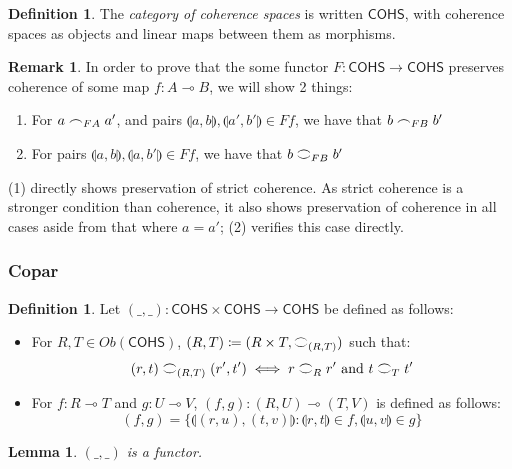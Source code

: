 \documentclass[11pt, oneside]{article}
\theoremstyle{plain}
\newtheorem{lemma}[theorem]{Lemma}
\theoremstyle{definition}
\newtheorem{definition}[theorem]{Definition}
\newtheorem*{remark}{Remark}
\newcommand{\lp}{\llparenthesis}
\newcommand{\rp}{\rrparenthesis}
\newcommand{\cohs}{{\mathsf{COHS}}}
\newcommand{\coh}[1][]{\mathrel{\vcenter{\offinterlineskip\hbox{$\frown$}\vskip0.2ex\hbox{$\smile$}}_{\ifx\\#1\\\else#1\fi}}}
\newcommand{\scoh}[1][]{\mathrel{\frown}_{\ifx\\#1\\\else#1\fi}}
\begin{document}
\begin{definition}
    The \textit{category of coherence spaces} is written $\cohs$, with coherence spaces as objects and linear maps between them as morphisms.
\end{definition}

\begin{remark}
In order to prove that the some functor $F:\cohs\to\cohs$ preserves coherence of some map $f:A\multimap B$, we will show 2 things:
\begin{enumerate}
    \item
    For $a\scoh[FA]a'$, and pairs $\lp a,b\rp,\lp a',b'\rp\in Ff$, we have that $b\scoh[FB]b'$
    \item 
    For pairs $\lp a,b\rp,\lp a,b'\rp\in Ff$, we have that $b\coh[FB]b'$
\end{enumerate}
(1) directly shows preservation of strict coherence. As strict coherence is a stronger condition than coherence, it also shows preservation of coherence in all cases aside from that where $a=a'$;
(2) verifies this case directly.
\end{remark}

\subsubsection{Copar}
\begin{definition}
    Let $(\_,\_):\cohs\times\cohs\to\cohs$ be defined as follows:
    \begin{itemize}
        \item
        For $R,T\in Ob(\cohs)$, $(R,T) \coloneqq (R\times T,\coh[(R,T)])$ such that:
        $$(r,t)\coh[(R,T)](r',t')\iff r\coh[R]r'\text{ and }t\coh[T]t'$$

        \item
        For $f:R\multimap T$ and $g:U\multimap V$, 
        $(f,g):(R,U)\multimap(T,V)$ is defined as follows:
        $$(f,g)=\{\lp(r,u),(t,v)\rp:\lp r,t\rp\in f,\lp u,v\rp\in g\}$$
    \end{itemize}
\end{definition}

\begin{lemma}\label{lem:CoparIsFunctor}
    $(\_,\_)$ is a functor.
\end{lemma}
\end{document}
